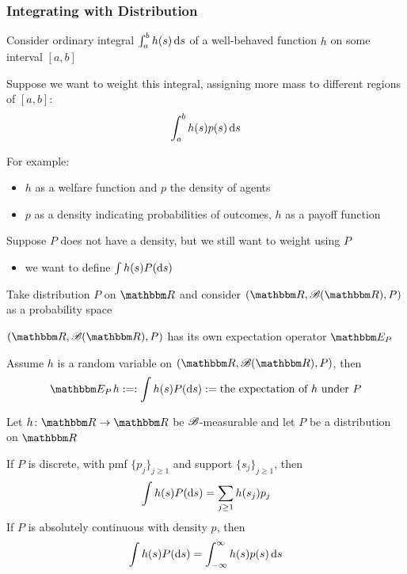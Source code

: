 \begin{frame}\frametitle{Integrating with Distribution}

    \vspace{2em}
    Consider ordinary integral $\int_a^b
    h(s)\mathop{}\!\mathrm{d} s$ of a well-behaved function $h$ on some interval $[a, b]$
    
    Suppose we want to weight this integral, assigning more mass to different regions of
    $[a, b]$: $$\int_a^b h(s) p(s) \mathop{}\!\mathrm{d} s$$
    
    For example:
    \begin{itemize}
        \item $h$ as a welfare function and $p$ the density of agents 
        \item $p$ as a density
    indicating probabilities of outcomes, $h$ as a payoff function 
    \end{itemize}

\end{frame}

\begin{frame}

    \vspace{2em}
    Suppose $P$ does not have a density, but we still want to weight using $P$
    \begin{itemize}
        \item we want to define $\int h(s) P(\mathop{}\!\mathrm{d} s)$ 
    \end{itemize}
    
    Take distribution $P$ on $\RR$ and consider $(\RR, \bB(\RR), P)$ as a probability space
    
    $(\RR, \bB(\RR), P)$ has its own expectation operator $\EEP $ 
    
    Assume $h$ is a random variable on $(\RR, \bB(\RR), P)$, then
    \begin{equation*}
        \EEP h :=: \int h(s) P(\diff s) 
        := \text{the expectation of $h$ under $P$}
    \end{equation*}
    
\end{frame}

\begin{frame}

    \vspace{2em}
    \Fact
    Let $h \colon \RR \to \RR$ be $\mathscr B$-measurable and let $P$ be a
    distribution on $\RR$
    
    If $P$
    is discrete, with {\sc pmf} $\{p_j\}_{j \geq 1}$ and support
    $\{s_j\}_{j \geq 1}$, then
    \begin{equation*}
        \label{eq:hasp}
        \int h(s) P(\mathop{}\!\mathrm{d} s) = \sum_{j\geq 1} h(s_j) p_j 
    \end{equation*}
    If $P$ is absolutely continuous with density $p$, then
    \begin{equation*}
        \label{eq:hasd}
        \int h(s)P(\mathop{}\!\mathrm{d} s) = \int_{-\infty}^{\infty} h(s) p(s) \mathop{}\!\mathrm{d} s
    \end{equation*}
\end{frame}


